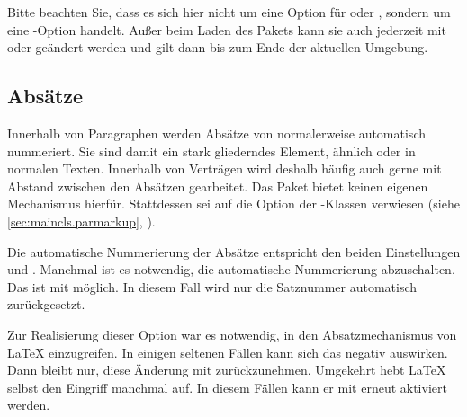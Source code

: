 Bitte beachten Sie, dass es sich hier nicht um eine Option
für  oder ,
sondern um eine \KOMAScript-Option handelt. Außer beim Laden des Pakets kann
sie auch jederzeit mit  oder
 geändert werden und gilt dann bis zum Ende
der aktuellen Umgebung.%
\EndIndexGroup \EndIndexGroup

\subsection{Absätze}
\label{sec:scrjura.par}
\BeginIndexGroup
{}%
Innerhalb von Paragraphen werden Absätze von  normalerweise
automatisch nummeriert. Sie sind damit ein stark gliederndes Element, ähnlich
 oder  in
normalen Texten. Innerhalb von Verträgen wird deshalb häufig auch gerne mit
Abstand zwischen den Absätzen gearbeitet. Das Paket  bietet
keinen eigenen Mechanismus hierfür. Stattdessen sei auf die Option
%
 der
\KOMAScript-Klassen verwiesen (siehe \autoref{sec:maincls.parmarkup},
).

\begin{Declaration}
\end{Declaration}
Die automatische Nummerierung der Absätze entspricht
den beiden Einstellungen  und
. Manchmal ist es notwendig, die automatische
Nummerierung abzuschalten. Das ist mit %
%
 möglich. In diesem Fall wird nur die
Satznummer automatisch zurückgesetzt.

Zur Realisierung dieser Option war es notwendig, in den Absatzmechanismus von
\LaTeX{} einzugreifen. In einigen seltenen Fällen kann sich das negativ
auswirken. Dann bleibt nur, diese Änderung mit
%
%
 zurückzunehmen. Umgekehrt hebt
\LaTeX{} selbst den Eingriff manchmal auf. In diesem Fällen kann er mit
%
%
 erneut aktiviert werden.

